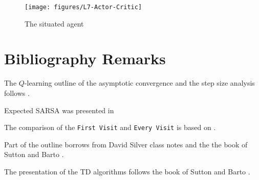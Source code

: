 \begin{figure}
  \begin{centering}
  \texttt{[image: figures/L7-Actor-Critic]}
  \caption{The situated agent}\label{fig:L7-Actor-Critic}
  \end{centering}
\end{figure}





\section{Bibliography Remarks}

The $Q$-learning outline of the asymptotic convergence and the step
size analysis follows \cite{Even-DarM03}.

Expected SARSA was presented in \cite{SeijenHWW09}

The comparison of the {\tt First Visit} and {\tt Every Visit} is
based on \cite{SinghS96}.

Part of the outline borrows from David Silver class notes and the
the book of Sutton and Barto \cite{SuttonB98}.


The presentation of the TD algorithms follows the book of Sutton and
Barto \cite{SuttonB98}.
